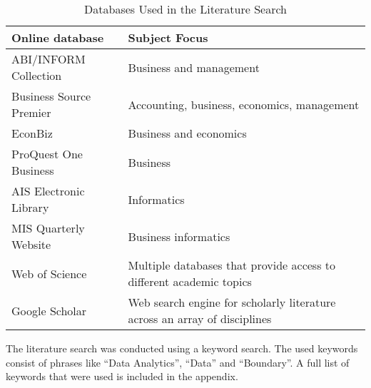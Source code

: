 \begin{table}[htbp]
    \centering
    \small
    \begin{tabular}{lL{8cm}}
    \hline
    Online database           & Subject Focus                                                          \\ \hline
    ABI/INFORM Collection     & Business and management                                                \\
    Business Source Premier   & Accounting, business, economics, management                            \\
    EconBiz                   & Business and economics                                                 \\
    ProQuest One Business     & Business                                                               \\
    AIS Electronic Library    & Informatics                                                            \\
    MIS Quarterly Website     & Business informatics                                                   \\
    Web of Science            & Multiple databases that provide access to different academic topics    \\
    Google Scholar            & Web search engine for scholarly literature across an array of disciplines \\ \hline
    \end{tabular}
    \caption{Databases Used in the Literature Search}
    \label{literature_search_db}
    \end{table}


The literature search was conducted using a keyword search. The used keywords consist of phrases like \enquote{Data Analytics}, \enquote{Data} and \enquote{Boundary}. A full list of keywords that were used is included in the appendix. %


